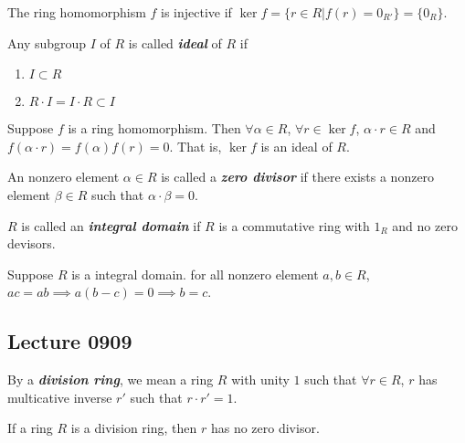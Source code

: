 \documentclass{article}
\begin{document}
\begin{multicols}{2}
\begin{remark}
The ring homomorphism $f$ is injective if $\ker f=\{r\in R|f(r)=0_{R'}\}=\{0_R\}$.
\end{remark}

\begin{mydefinition}
Any subgroup $I$ of $R$ is called \textbf{\emph{ideal}} of $R$ if
\begin{enumerate}[label={(\alph*)}]
\item $I\subset R$
\item $R\cdot I=I\cdot R\subset I$
\end{enumerate}
\end{mydefinition}

\begin{example}
Suppose $f$ is a ring homomorphism. Then $\forall \alpha\in R$, $\forall r\in \ker f$, $\alpha \cdot r\in R$ and $f(\alpha \cdot r)=f(\alpha)f(r)=0$. That is, $\ker f$ is an ideal of $R$.
\end{example}

\begin{mydefinition}
An nonzero element $\alpha\in R$ is called a \textbf{\emph{zero divisor}} if there exists a nonzero element $\beta\in R$ such that $\alpha \cdot \beta = 0$.
\end{mydefinition}

\begin{mydefinition}
$R$ is called an \textbf{\emph{integral domain}} if $R$ is a commutative ring with $1_R$ and no zero devisors.
\end{mydefinition}

\begin{myproposition}
Suppose $R$ is a integral domain. for all nonzero element $a,b\in R$, $ac=ab \implies a(b-c)=0 \implies b=c$.
\end{myproposition}

\subsection{Lecture 0909}
\begin{mydefinition}
By a \textbf{\emph{division ring}}, we mean a ring $R$ with unity $1$ such that $\forall r\in R$, $r$ has multicative inverse $r'$ such that $r\cdot r'=1$.
\end{mydefinition}
\begin{myproposition}
If a ring $R$ is a division ring, then $r$ has no zero divisor.
\end{myproposition}


\end{multicols}
\end{document}
